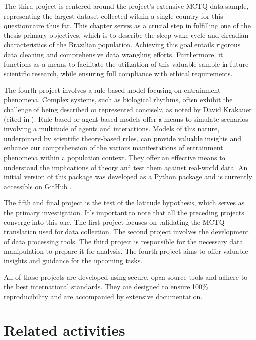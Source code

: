 \documentclass[
12pt,
openright,
oneside,
a4paper,
chapter=TITLE,
section=TITLE,
french,
spanish,
brazil,
english
]{abntex2}\usepackage{array}
\begin{document}
The third project is centered around the project's extensive MCTQ data
sample, representing the largest dataset collected within a single
country for this questionnaire thus far. This chapter serves as a
crucial step in fulfilling one of the thesis primary objectives, which
is to describe the sleep-wake cycle and circadian characteristics of the
Brazilian population. Achieving this goal entails rigorous data cleaning
and comprehensive data wrangling efforts. Furthermore, it functions as a
means to facilitate the utilization of this valuable sample in future
scientific research, while ensuring full compliance with ethical
requirements.

The fourth project involves a rule-based model focusing on entrainment
phenomena. Complex systems, such as biological rhythms, often exhibit
the challenge of being described or represented concisely, as noted by
David Krakauer (cited in \textcite{mitchell2013}). Rule-based or
agent-based models offer a means to simulate scenarios involving a
multitude of agents and interactions. Models of this nature, underpinned
by scientific theory-based rules, can provide valuable insights and
enhance our comprehension of the various manifestations of entrainment
phenomena within a population context. They offer an effective means to
understand the implications of theory and test them against real-world
data. An initial version of this package was developed as a Python
package and is currently accessible on
\href{https://entrainment.readthedocs.io/en/latest/index.html}{GitHub}
\autocite[see][]{vartanian2022}.


The fifth and final project is the test of the latitude hypothesis,
which serves as the primary investigation. It's important to note that
all the preceding projects converge into this one. The first project
focuses on validating the MCTQ translation used for data collection. The
second project involves the development of data processing tools. The
third project is responsible for the necessary data manipulation to
prepare it for analysis. The fourth project aims to offer valuable
insights and guidance for the upcoming tasks.

All of these projects are developed using secure, open-source tools and
adhere to the best international standards. They are designed to ensure
100\% reproducibility and are accompanied by extensive documentation.

\section{Related activities}\label{related-activities}
\end{document}
